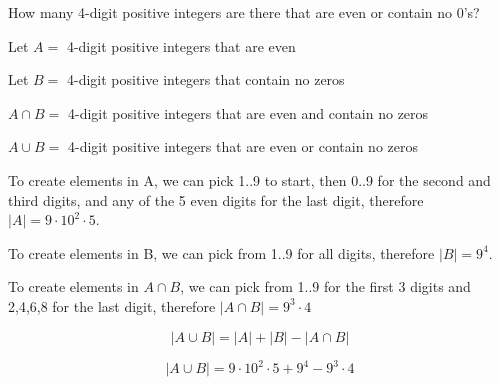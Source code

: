 \documentclass[openany, 11pt]{book}
\begin{document}
\begin{exercise}{}{}
	How many 4-digit positive integers are there that are even or contain no 0's?
	\begin{alist}
		\item Let $A=$ 4-digit positive integers that are even
		\item Let $B=$ 4-digit positive integers that contain no zeros
		\item $A \cap B=$ 4-digit positive integers that are even and contain no zeros
		\item $A \cup B=$ 4-digit positive integers that are even or contain no zeros
		\item To create elements in A, we can pick 1..9 to start, then 0..9 for the
		second and third digits, and any of the 5 even digits for the last
		digit, therefore $|A|=9\cdot 10^2\cdot5$.
		\item To create elements in B, we can pick from 1..9 for all digits,
		therefore $|B|=9^4$.
		\item To create elements in $A\cap B$, we can pick from 1..9 for the first
		3 digits and 2,4,6,8 for the last digit, therefore $|A\cap B|=9^3\cdot4$
		\item $$|A\cup B| = |A| + |B| - |A\cap B|$$
		\item $$|A\cup B| = 9\cdot10^2\cdot5 + 9^4 - 9^3\cdot4$$
	\end{alist}
\end{exercise}
\end{document}
